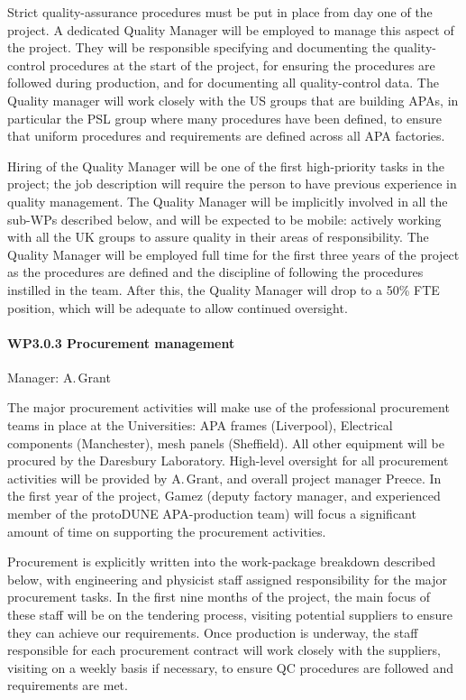 Strict quality-assurance procedures must be put in place from day one of the project. A dedicated Quality Manager will be employed to manage this aspect of the project. They will be responsible specifying and documenting the quality-control procedures at the start of the project, for ensuring the procedures are followed during production, and for documenting all quality-control data. The Quality manager will work closely with the US groups that are building APAs, in particular the PSL group where many procedures have been defined, to ensure that uniform procedures and requirements are defined across all APA factories.

Hiring of the Quality Manager will be one of the first high-priority tasks in the project; the job description will require the person to have previous experience in quality management.
The Quality Manager will be implicitly involved in all the sub-WPs described below, and will be expected to be mobile: actively working with all the UK groups to assure quality in their areas of responsibility. The Quality Manager will be employed full time for the first three years of the project as the procedures are defined and the discipline of following the procedures instilled in the team. After this, the Quality Manager will drop to a 50\% FTE position, which will be adequate to allow continued oversight.

\paragraph{WP3.0.3 Procurement management}

Manager: A.\,Grant

The major procurement activities will make use of the professional procurement teams in place at the Universities: APA frames (Liverpool), Electrical components (Manchester), mesh panels (Sheffield). All other equipment will be procured by the Daresbury Laboratory. High-level oversight for all procurement activities will be provided by A.\,Grant, and overall project manager Preece. In the first year of the project, Gamez (deputy factory manager, and experienced member of the protoDUNE APA-production team) will focus a significant amount of time on supporting the procurement activities.

Procurement is explicitly written into the work-package breakdown described below, with engineering and physicist staff assigned responsibility for the major procurement tasks. In the first nine months of the project, the main focus of these staff will be on the tendering process, visiting potential suppliers to ensure they can achieve our requirements. Once production is underway, the staff responsible for each procurement contract will work closely with the suppliers, visiting on a weekly basis if necessary, to ensure QC procedures are followed and requirements are met.


